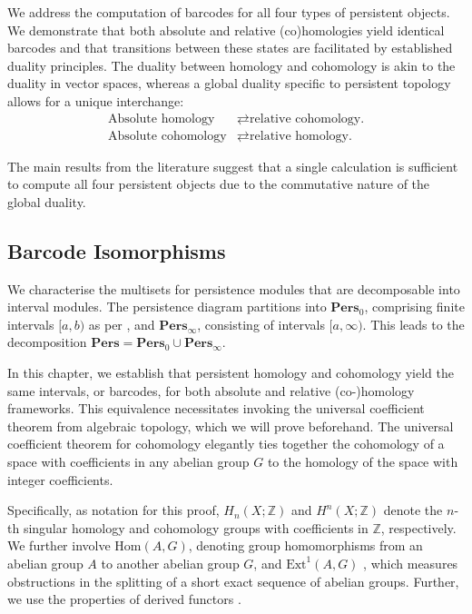 We address the computation of barcodes for all four types of persistent
objects. We demonstrate that both absolute and relative (co)homologies yield identical
barcodes and that transitions between these states are facilitated by established
duality principles. The duality between homology and cohomology is akin to the
duality in vector spaces, whereas a global duality specific to persistent topology
allows for a unique interchange:
\begin{align*}
	\text{Absolute homology}   & \rightleftarrows \text{relative cohomology.} \\
	\text{Absolute cohomology} & \rightleftarrows \text{relative homology.}
\end{align*}

The main results from the literature suggest that a single calculation is sufficient
to compute all four persistent objects due to the commutative nature of the global
duality.

\subsection{Barcode Isomorphisms}
\label{BarcodeIsomorphisms}
We characterise the multisets for persistence modules that are decomposable into
interval modules. The persistence diagram partitions into $\textbf{Pers}_{0}$,
comprising finite intervals $[a, b)$ as per \cite[\S 2.3]{de2011dualities}, and $\textbf{Pers}_{\infty}$, consisting of intervals $[a, \infty)$. This leads to the decomposition
$\textbf{Pers}= \textbf{Pers}_{0} \cup \textbf{Pers}_{\infty}$.

In this chapter, we establish that persistent homology and cohomology yield the
same intervals, or barcodes, for both absolute and relative (co-)homology
frameworks. This equivalence necessitates invoking the universal coefficient theorem
from algebraic topology, which we will prove beforehand. The universal coefficient
theorem for cohomology elegantly ties together the cohomology of a space with coefficients
in any abelian group $G$ to the homology of the space with integer coefficients.

Specifically, as notation for this proof, $H_{n}(X;\mathbb{Z})$ and
$H^{n}(X;\mathbb{Z})$ denote the $n$-th singular homology and cohomology groups
with coefficients in $\mathbb{Z}$, respectively. We further involve
$\text{Hom}(A, G)$, denoting group homomorphisms from an abelian group $A$ to another
abelian group $G$, and $\text{Ext}^{1}(A, G)$ \cite[\S 4.3]{hatcher2005algebraic}, which measures obstructions
in the splitting of a short exact sequence of abelian groups. Further, we use the
properties of derived functors \cite[\S 2.7]{Weibel1994}.

